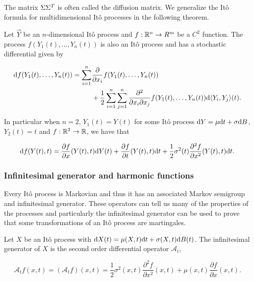 The matrix $\Sigma \Sigma^T$ is often called the diffusion matrix. We generalize the Itô formula for multidimensional Itô processes in the following theorem.

\begin{theorem}
    Let $\vec Y $ be an $n$-dimensional Itô process and $f: \mathbb R^n \to R^m$ be a $C^2$ function. The process $f(Y_1(t), \dots, Y_n(t))$ is also an Itô process and has a stochastic differential given by

    \begin{align*}
        \mathrm d f(Y_1(t), \dots, Y_n(t)) = \sum_{i=1}^n &\frac{\partial}{\partial x_i} f(Y_1(t), \dots, Y_n(t))\\  
        &+ \frac12 \sum_{i=1}^n \sum_{j=1}^n \frac{\partial^2}{\partial x_i\partial x_j} f(Y_1(t), \dots, Y_n(t)) \mathrm d \langle Y_i, Y_j\rangle (t).
    \end{align*}
\end{theorem}

In particular when $n=2$, $Y_1(t) = Y(t)$ for some Itô process $\mathrm d Y = \mu \mathrm d t + \sigma \mathrm d B$, $Y_2(t) = t$ and $f:\mathbb R^2 \to \mathbb R$, we have that

\begin{equation} \label{eq:ito_2var}
    \mathrm d f(Y(t),t) = \frac{\partial f}{\partial x} (Y(t),t) \mathrm d Y(t) + \frac{\partial f}{\partial t} (Y(t),t) \mathrm d t + \frac12 \sigma^2(t)\frac{\partial^2f}{\partial x^2} (Y(t),t) \mathrm d t.
\end{equation}


\subsubsection{Infinitesimal generator and harmonic functions}

Every Itô process is Markovian and thus it has an associated Markov semigroup and infinitesimal generator. These operators can tell us many of the properties of the processes and particularly the infinitesimal generator can be used to prove that some transformations of an Itô process are martingales.

\begin{definition}
    Let $X$ be an Itô process with $\mathrm d X(t) = \mu(X,t) \mathrm d t + \sigma(X,t) \mathrm d B(t)$. The infinitesimal generator  of $X$ is the second order differential operator $\mathcal A_t$,

    \begin{equation*}
        \mathcal A_t f(x,t) = (\mathcal A_t f)(x,t) = \frac12 \sigma^2(x,t) \frac{\partial^2 f}{\partial x^2} (x,t) + \mu(x,t)\frac{\partial f}{\partial x}(x,t).
    \end{equation*}
\end{definition}

